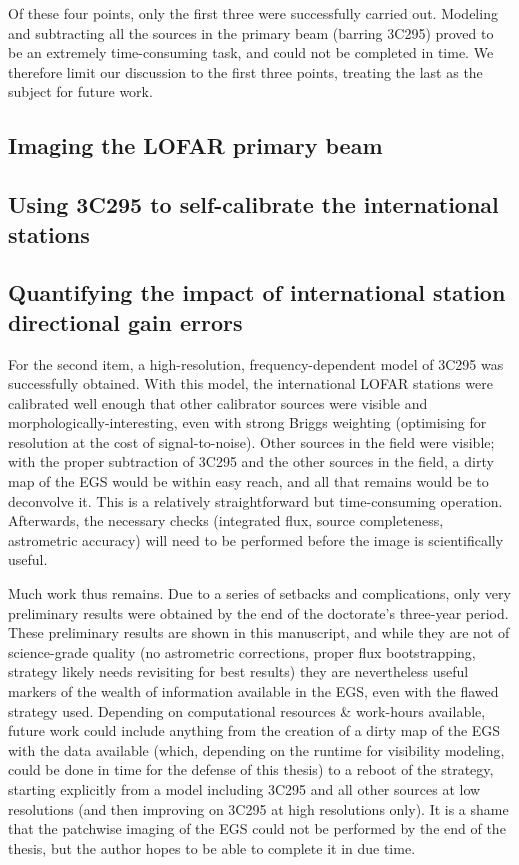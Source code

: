 \pg
Of these four points, only the first three were successfully carried out. Modeling and subtracting all the sources in the primary beam (barring 3C295) proved to be an extremely time-consuming task, and could not be completed in time. We therefore limit our discussion to the first three points, treating the last as the subject for future work.

\subsection{Imaging the LOFAR primary beam}

\subsection{Using 3C295 to self-calibrate the international stations}

\subsection{Quantifying the impact of international station directional gain errors}

\pg
For the second item, a high-resolution, frequency-dependent model of 3C295 was successfully obtained. With this model, the international LOFAR stations were calibrated well enough that other calibrator sources were visible and morphologically-interesting, even with strong Briggs weighting (optimising for resolution at the cost of signal-to-noise). Other sources in the field were visible; with the proper subtraction of 3C295 and the other sources in the field, a dirty map of the EGS would be within easy reach, and all that remains would be to deconvolve it. This is a relatively straightforward but time-consuming operation. Afterwards, the necessary checks (integrated flux, source completeness, astrometric accuracy) will need to be performed before the image is scientifically useful. 


\pg
Much work thus remains. Due to a series of setbacks and complications, only very preliminary results were obtained by the end of the doctorate's three-year period. These preliminary results are shown in this manuscript, and while they are not of science-grade quality (no astrometric corrections, proper flux bootstrapping, strategy likely needs revisiting for best results) they are nevertheless useful markers of the wealth of information available in the EGS, even with the flawed strategy used. Depending on computational resources \& work-hours available, future work could include anything from the creation of a dirty map of the EGS with the data available (which, depending on the runtime for visibility modeling, could be done in time for the defense of this thesis) to a reboot of the strategy, starting explicitly from a model including 3C295 and all other sources at low resolutions (and then improving on 3C295 at high resolutions only). It is a shame that the patchwise imaging of the EGS could not be performed by the end of the thesis, but the author hopes to be able to complete it in due time.

